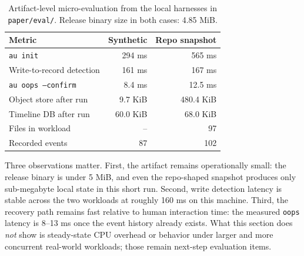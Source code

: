 \documentclass[10pt,a4paper]{article}
\begin{document}
\begin{table}[t]
\centering
\footnotesize
\begin{tabular}{lrr}
\toprule
\textbf{Metric} & \textbf{Synthetic} & \textbf{Repo snapshot} \\
\midrule
\texttt{au init} & 294 ms & 565 ms \\
Write-to-record detection & 161 ms & 167 ms \\
\texttt{au oops --confirm} & 8.4 ms & 12.5 ms \\
Object store after run & 9.7 KiB & 480.4 KiB \\
Timeline DB after run & 60.0 KiB & 68.0 KiB \\
Files in workload & -- & 97 \\
Recorded events & 87 & 102 \\
\bottomrule
\end{tabular}
\caption{Artifact-level micro-evaluation from the local harnesses in \texttt{paper/eval/}. Release binary size in both cases: 4.85 MiB.}
\label{tab:microeval}
\end{table}

Three observations matter. First, the artifact remains operationally small: the
release binary is under 5 MiB, and even the repo-shaped snapshot produces only
sub-megabyte local state in this short run. Second, write detection latency is
stable across the two workloads at roughly 160 ms on this machine. Third, the
recovery path remains fast relative to human interaction time: the measured
\texttt{oops} latency is 8--13 ms once the event history already exists. What
this section does \emph{not} show is steady-state CPU overhead or behavior
under larger and more concurrent real-world workloads; those remain next-step
evaluation items.
\end{document}

